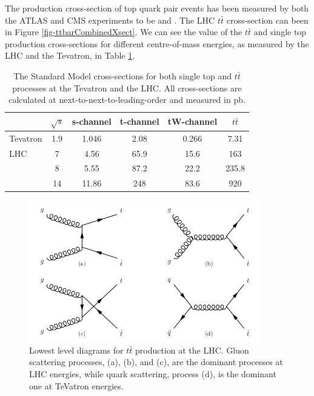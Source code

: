 The production cross-section of top quark pair events has been measured by both the ATLAS and CMS experiments to be  \cite{} and \cite{}. The LHC $t\bar{t}$ cross-section can been in Figure \ref{fig-ttbarCombinedXsect}. We can see the value of the $t\bar{t}$ and single top production cross-sections for different centre-of-mass energies, as measured by the LHC and the Tevatron, in Table \ref{tab-ttbarcrosssections}. 

\begin{table}
\begin{center}
\begin{tabular}{lccccc}
\hline
\hline
& \textbf{$\sqrt{s}$} & \textbf{s-channel} & \textbf{t-channel} & \textbf{tW-channel} & \textbf{$t\bar{t}$} \\
\hline
Tevatron & 1.9 & 1.046 & 2.08 & 0.266 & 7.31 \\
LHC & 7 & 4.56 & 65.9 & 15.6 & 163 \\ 
 & 8 & 5.55 & 87.2 & 22.2 & 235.8 \\
 & 14 & 11.86 & 248 & 83.6 & 920 \\
\hline
\hline
\end{tabular}
\end{center}
\caption{The Standard Model cross-sections for both single top and $t\bar{t}$ processes at the Tevatron and the LHC. All cross-sections are calculated at next-to-next-to-leading-order and measured in pb. \cite{Czakon:2013goa}}
\label{tab-ttbarcrosssections}
\end{table}

\begin{figure} 
\begin{center}
\includegraphics[width=0.9\textwidth]{Figures/ttbarProductionLHC.png}
\end{center}
\caption{Lowest level diagrams for $t\bar{t}$ production at the LHC. Gluon scattering processes, {(a)}, {(b)}, and {(c)}, are the dominant processes at LHC energies, while quark scattering, process {(d)}, is the dominant one at TeVatron energies. \cite{SergeyThesis}}
\label{fig-ttbarProductionLHC}
\end{figure}

